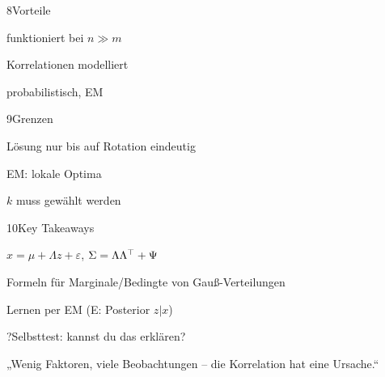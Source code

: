 \begin{hngrid}
\begin{hnp}[raster multicolumn=2,acc=hngreen]{8}{Vorteile}
\begin{hnpro}
\item funktioniert bei $n\gg m$
\item Korrelationen modelliert
\item probabilistisch, EM
\end{hnpro}
\end{hnp}
%
\begin{hnp}[raster multicolumn=2,acc=hnred]{9}{Grenzen}
\begin{hncon}
\item Lösung nur bis auf Rotation eindeutig
\item EM: lokale Optima
\item $k$ muss gewählt werden
\end{hncon}
\end{hnp}
%
\begin{hnp}[raster multicolumn=6,acc=hnorange]{10}{Key Takeaways}
\begin{hnchk}
\item $x=\mu+\Lambda z+\varepsilon$, $\Sigma=\Lambda\Lambda^{\top}+\Psi$
\item Formeln für Marginale/Bedingte von Gauß-Verteilungen
\item Lernen per EM (E: Posterior $z|x$)
\end{hnchk}
\end{hnp}
%
\begin{hnp}[raster multicolumn=6,acc=hnpurple,colback=hnlilac!30]{?}{Selbsttest: kannst du das erklären?}
\end{hnp}
%
\begin{hnbanner}[raster multicolumn=6]
„Wenig Faktoren, viele Beobachtungen -- die Korrelation hat eine Ursache.“
\end{hnbanner}
\end{hngrid}
